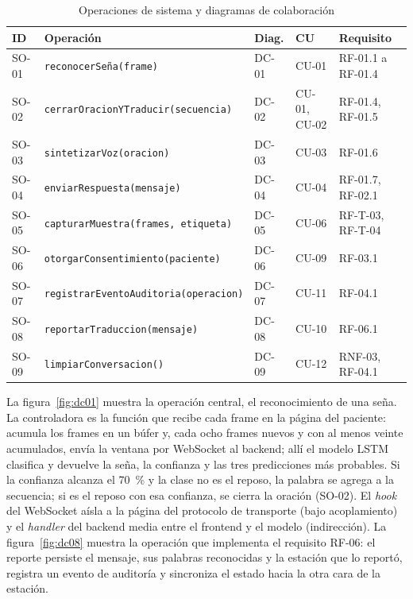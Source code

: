 \begin{table}[H]
  \centering
  \caption{Operaciones de sistema y diagramas de colaboración}\label{tab:so}
  \small
  \begin{tabularx}{\textwidth}{>{\raggedright\arraybackslash}p{1.3cm} >{\raggedright\arraybackslash}p{5.4cm} >{\raggedright\arraybackslash}p{1.4cm} >{\raggedright\arraybackslash}p{2.4cm} X}
    \toprule
    \textbf{ID} & \textbf{Operación} & \textbf{Diag.} & \textbf{CU} & \textbf{Requisito} \\
    \midrule
    SO-01 & \texttt{reconocerSeña(frame)} & DC-01 & CU-01 & RF-01.1 a RF-01.4 \\
    SO-02 & \texttt{cerrarOracionYTraducir(\allowbreak secuencia)} & DC-02 & CU-01, CU-02 & RF-01.4, RF-01.5 \\
    SO-03 & \texttt{sintetizarVoz(oracion)} & DC-03 & CU-03 & RF-01.6 \\
    SO-04 & \texttt{enviarRespuesta(mensaje)} & DC-04 & CU-04 & RF-01.7, RF-02.1 \\
    SO-05 & \texttt{capturarMuestra(frames, etiqueta)} & DC-05 & CU-06 & RF-T-03, RF-T-04 \\
    SO-06 & \texttt{otorgarConsentimiento(\allowbreak paciente)} & DC-06 & CU-09 & RF-03.1 \\
    SO-07 & \texttt{registrarEventoAuditoria(\allowbreak operacion)} & DC-07 & CU-11 & RF-04.1 \\
    SO-08 & \texttt{reportarTraduccion(mensaje)} & DC-08 & CU-10 & RF-06.1 \\
    SO-09 & \texttt{limpiarConversacion()} & DC-09 & CU-12 & RNF-03, RF-04.1 \\
    \bottomrule
  \end{tabularx}
\end{table}

La figura~\ref{fig:dc01} muestra la operación central, el reconocimiento de una seña. La controladora es la función que recibe cada frame en la página del paciente: acumula los frames en un búfer y, cada ocho frames nuevos y con al menos veinte acumulados, envía la ventana por WebSocket al backend; allí el modelo LSTM clasifica y devuelve la seña, la confianza y las tres predicciones más probables. Si la confianza alcanza el 70~\% y la clase no es el reposo, la palabra se agrega a la secuencia; si es el reposo con esa confianza, se cierra la oración (SO-02). El \emph{hook} del WebSocket aísla a la página del protocolo de transporte (bajo acoplamiento) y el \emph{handler} del backend media entre el frontend y el modelo (indirección). La figura~\ref{fig:dc08} muestra la operación que implementa el requisito RF-06: el reporte persiste el mensaje, sus palabras reconocidas y la estación que lo reportó, registra un evento de auditoría y sincroniza el estado hacia la otra cara de la estación.

